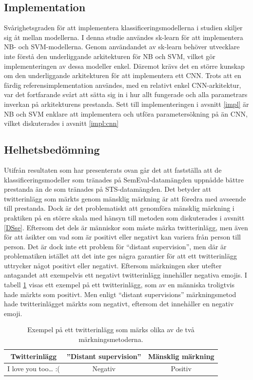 \documentclass{kaumasters} %
\begin{document}
\subsection{Implementation}
Svårighetsgraden för att implementera klassificeringsmodellerna i studien skiljer sig åt mellan modellerna. I denna studie användes sk-learn för att implementera NB- och SVM-modellerna. Genom användandet av sk-learn behöver utvecklare inte förstå den underliggande arkitekturen för NB och SVM, vilket gör implementeringen av dessa modeller enkel. Däremot krävs det en större kunskap om den underliggande arkitekturen för att implementera ett CNN. Trots att en färdig referensimplementation användes, med en relativt enkel CNN-arkitektur, var det fortfarande svårt att sätta sig in i hur allt fungerade och alla parametrars inverkan på arkitekturens prestanda. Sett till implementeringen i avsnitt \ref{impl} är NB och SVM enklare att implementera och utföra parametersökning på än CNN, vilket diskuterades i avsnitt \ref{impl:cnn}
\subsection{Helhetsbedömning} \label{res:hhb}
Utifrån resultaten som har presenterats ovan går det att fastställa att de klassificeringsmodeller som tränades på SemEval-datamängden uppnådde bättre prestanda än de som tränades på STS-datamängden. Det betyder att twitterinlägg som märkts genom mänsklig märkning är att föredra med avseende till prestanda. Dock är det problematiskt att genomföra mänsklig märkning i praktiken på en större skala med hänsyn till metoden som diskuterades i avsnitt \ref{DSse}. Eftersom det dels är människor som måste märka twitterinlägg, men även för att åsikter om vad som är positivt eller negativt kan variera från person till person. Det är dock inte ett problem för “distant supervision”, men där är problematiken istället att det inte ges några garantier för att ett twitterinlägg uttrycker något positivt eller negativt. Eftersom märkningen sker utefter antagandet att exempelvis ett negativt twitterinlägg innehåller negativa emojis. I tabell \ref{tab:exp_mark} visas ett exempel på ett twitterinlägg, som av en människa troligtvis hade märkts som positivt. Men enligt “distant supervisions” märkningsmetod  hade twitterinlägget märkts som negativt, eftersom det innehåller en negativ emoji.

\begin{table}[H]
\centering
\caption{Exempel på ett twitterinlägg som märks olika av de två märkningsmetoderna.}
\label{tab:exp_mark}
  \begin{tabular}{ccc}
  \toprule
  \textbf{Twitterinlägg} & \textbf{''Distant supervision''}  & \textbf{Mänsklig märkning} \\
  \midrule
  I love you too… :( & Negativ & Positiv \\
  \bottomrule
\end{tabular}
\end{table}
\end{document}
